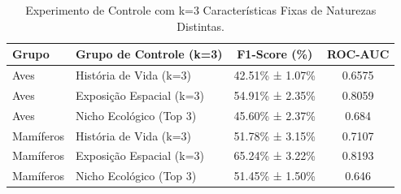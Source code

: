 \begin{table}[htbp]
\centering
\caption{Experimento de Controle com k=3 Características Fixas de Naturezas Distintas.}
\label{tab:controle_k3}
\begin{tabular}{llcc}
\hline
\textbf{Grupo} & \textbf{Grupo de Controle (k=3)} & \textbf{F1-Score (\%)} & \textbf{ROC-AUC} \\
\hline
Aves & História de Vida (k=3) & 42.51\% ± 1.07\% & 0.6575 \\
Aves & Exposição Espacial (k=3) & 54.91\% ± 2.35\% & 0.8059 \\
Aves & Nicho Ecológico (Top 3) & 45.60\% ± 2.37\% & 0.684 \\
Mamíferos & História de Vida (k=3) & 51.78\% ± 3.15\% & 0.7107 \\
Mamíferos & Exposição Espacial (k=3) & 65.24\% ± 3.22\% & 0.8193 \\
Mamíferos & Nicho Ecológico (Top 3) & 51.45\% ± 1.50\% & 0.646 \\
\hline
\end{tabular}
\end{table}
